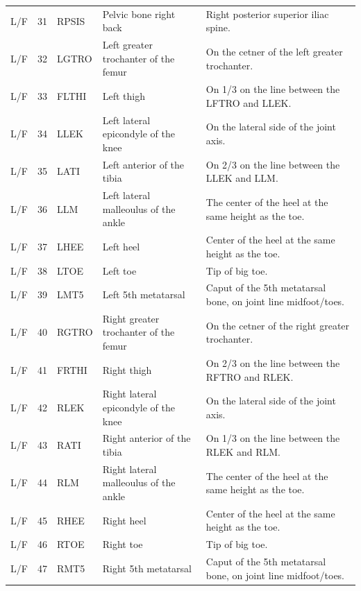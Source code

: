 \documentclass[10pt,a4paper,twocolumn]{article}
\begin{document}
\begin{table}
\begin{tabular}{lrlll}
    L/F & 31 & RPSIS & Pelvic bone right back                & Right posterior superior iliac spine. \\
    L/F & 32 & LGTRO & Left greater trochanter of the femur  & On the cetner of the left greater trochanter. \\
    L/F & 33 & FLTHI & Left thigh                            & On 1/3 on the line between the LFTRO and LLEK. \\
    L/F & 34 & LLEK  & Left lateral epicondyle of the knee   & On the lateral side of the joint axis. \\
    L/F & 35 & LATI  & Left anterior of the tibia            & On 2/3 on the line between the LLEK and LLM. \\
    L/F & 36 & LLM   & Left lateral malleoulus of the ankle  & The center of the heel at the same height as the toe. \\
    L/F & 37 & LHEE  & Left heel                             & Center of the heel at the same height as the toe. \\
    L/F & 38 & LTOE  & Left toe                              & Tip of big toe. \\
    L/F & 39 & LMT5  & Left 5th metatarsal                   & Caput of the 5th metatarsal bone, on joint line midfoot/toes. \\
    L/F & 40 & RGTRO & Right greater trochanter of the femur & On the cetner of the right greater trochanter. \\
    L/F & 41 & FRTHI & Right thigh                           & On 2/3 on the line between the RFTRO and RLEK. \\
    L/F & 42 & RLEK  & Right lateral epicondyle of the knee  & On the lateral side of the joint axis. \\
    L/F & 43 & RATI  & Right anterior of the tibia           & On 1/3 on the line between the RLEK and RLM. \\
    L/F & 44 & RLM   & Right lateral malleoulus of the ankle & The center of the heel at the same height as the toe. \\
    L/F & 45 & RHEE  & Right heel                            & Center of the heel at the same height as the toe. \\
    L/F & 46 & RTOE  & Right toe                             & Tip of big toe. \\
    L/F & 47 & RMT5  & Right 5th metatarsal                  & Caput of the 5th metatarsal bone, on joint line midfoot/toes. \\
    \bottomrule
  \end{tabular}
  \label{tab:marker-labels}
\end{table}
\end{document}
